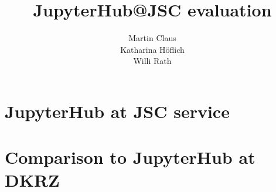 \documentclass[11pt,a4paper]{article}
\title{\textbf{JupyterHub@JSC evaluation}}
\author{
  Martin Claus \\ %
	Katharina Höflich \\
	Willi Rath}
\begin{document}
\maketitle


\tableofcontents


%





\section{JupyterHub at JSC service}










\section{Comparison to JupyterHub at DKRZ}
\label{s-comparison-dkrz}











\appendix





\end{document}

